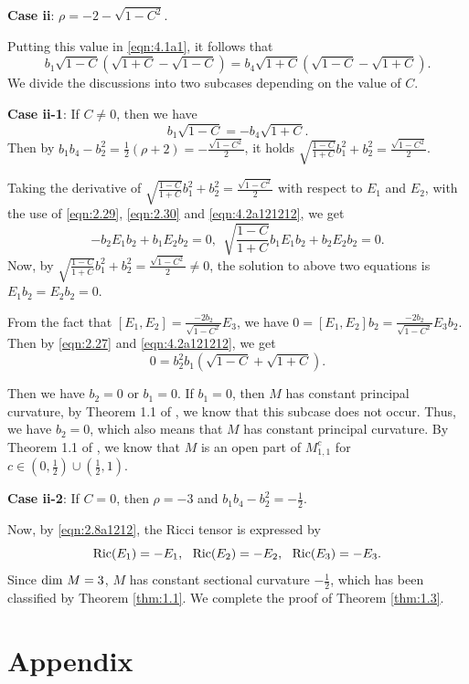 \documentclass[reqno]{amsart}%
\theoremstyle{definition}
\numberwithin{equation}{section}
\begin{document}
{\bf Case ii}: $\rho=-2-\sqrt{1-C^2}$.

Putting this value in \eqref{eqn:4.1a1}, it follows that
$$
b_1\sqrt{1-C}(\sqrt{1+C}-\sqrt{1-C})=b_4\sqrt{1+C}(\sqrt{1-C}-\sqrt{1+C}).
$$
We divide the discussions into two subcases depending on the value of $C$.

{\bf Case ii-1}: If $C\neq0$, then we have
\begin{equation}\label{eqn:4.2a121212}
b_1\sqrt{1-C}=-b_4\sqrt{1+C}.
\end{equation}
Then by $b_1b_4-b_2^2=\frac{1}{2}(\rho+2)=-\frac{\sqrt{1-C^2}}{2}$, it holds  $\sqrt{\frac{1-C}{1+C}}b_1^2+b_2^2=\frac{\sqrt{1-C^2}}{2}$.

Taking the derivative of $\sqrt{\frac{1-C}{1+C}}b_1^2+b_2^2=\frac{\sqrt{1-C^2}}{2}$ with respect to $E_1$ and $E_2$, with the use of \eqref{eqn:2.29}, \eqref{eqn:2.30} and \eqref{eqn:4.2a121212}, we get
$$
-b_2E_1b_2+b_1E_2b_2=0,\ \ \sqrt{\frac{1-C}{1+C}}b_1E_1b_2+b_2E_2b_2=0.
$$
Now, by $\sqrt{\frac{1-C}{1+C}}b_1^2+b_2^2=\frac{\sqrt{1-C^2}}{2}\neq0$,
the solution to above two equations is $E_1b_2=E_2b_2=0$.

From the fact that $[E_1,E_2]=\frac{-2b_2}{\sqrt{1-C^2}}E_3$, we have
$0=[E_1,E_2]b_2=\frac{-2b_2}{\sqrt{1-C^2}}E_3b_2$. Then by \eqref{eqn:2.27} and
\eqref{eqn:4.2a121212}, we get
$$0=b_2^2b_1(\sqrt{1-C}+\sqrt{1+C}).$$

Then we have $b_2=0$ or $b_1=0$. If $b_1=0$, then $M$ has constant principal curvature,
by Theorem 1.1 of \cite{GMY}, we know that this subcase does not occur.
Thus, we have $b_2=0$, which also means that $M$ has constant principal curvature.
By Theorem 1.1 of \cite{GMY}, we know that $M$ is an open part of $M_{1,1}^c$ for $c\in(0,\frac{1}{2})\cup(\frac{1}{2},1)$.

{\bf Case ii-2}: If $C=0$, then $\rho=-3$ and $b_1b_4-b_2^2=-\frac{1}{2}$.

Now, by \eqref{eqn:2.8a1212}, the Ricci tensor is expressed by
$$
{\rm Ric}(E_1)=-E_1,\ \ {\rm Ric}(E_2)=-E_2,\ \ {\rm Ric}(E_3)=-E_3.
$$
Since ${\rm dim}~M=3$, $M$ has constant sectional curvature $-\tfrac{1}{2}$,
which has been classified by Theorem \ref{thm:1.1}.
We complete the proof of Theorem \ref{thm:1.3}.



\section{Appendix}\label{sect:7}
\end{document}

